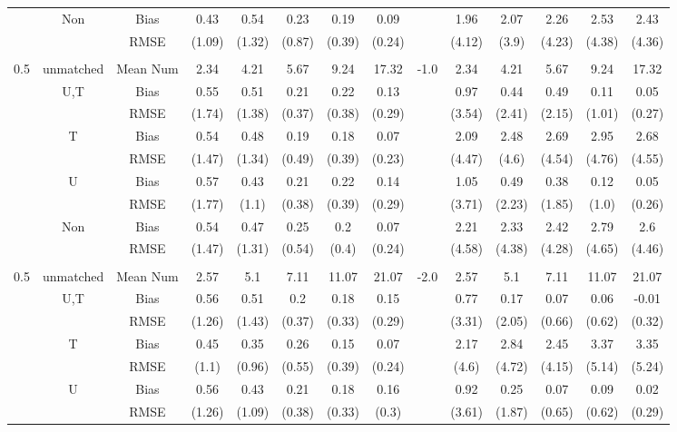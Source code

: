 \begin{tabular}{@{\extracolsep{5pt}}lc|cccccc|lccccc}
 & Non & Bias & 0.43 & 0.54 & 0.23 & 0.19 & 0.09 &  & 1.96 & 2.07 & 2.26 & 2.53 & 2.43 \\
 &  & RMSE & (1.09) & (1.32) & (0.87) & (0.39) & (0.24) &  & (4.12) & (3.9) & (4.23) & (4.38) & (4.36) \\
 &  &  &  &  &  &  &  &  &  &  &  &  &  \\
0.5 & unmatched & Mean Num & 2.34 & 4.21 & 5.67 & 9.24 & 17.32 & -1.0 & 2.34 & 4.21 & 5.67 & 9.24 & 17.32 \\
 & U,T & Bias & 0.55 & 0.51 & 0.21 & 0.22 & 0.13 &  & 0.97 & 0.44 & 0.49 & 0.11 & 0.05 \\
 &  & RMSE & (1.74) & (1.38) & (0.37) & (0.38) & (0.29) &  & (3.54) & (2.41) & (2.15) & (1.01) & (0.27) \\
 & T & Bias & 0.54 & 0.48 & 0.19 & 0.18 & 0.07 &  & 2.09 & 2.48 & 2.69 & 2.95 & 2.68 \\
 &  & RMSE & (1.47) & (1.34) & (0.49) & (0.39) & (0.23) &  & (4.47) & (4.6) & (4.54) & (4.76) & (4.55) \\
 & U & Bias & 0.57 & 0.43 & 0.21 & 0.22 & 0.14 &  & 1.05 & 0.49 & 0.38 & 0.12 & 0.05 \\
 &  & RMSE & (1.77) & (1.1) & (0.38) & (0.39) & (0.29) &  & (3.71) & (2.23) & (1.85) & (1.0) & (0.26) \\
 & Non & Bias & 0.54 & 0.47 & 0.25 & 0.2 & 0.07 &  & 2.21 & 2.33 & 2.42 & 2.79 & 2.6 \\
 &  & RMSE & (1.47) & (1.31) & (0.54) & (0.4) & (0.24) &  & (4.58) & (4.38) & (4.28) & (4.65) & (4.46) \\
 &  &  &  &  &  &  &  &  &  &  &  &  &  \\
0.5 & unmatched & Mean Num & 2.57 & 5.1 & 7.11 & 11.07 & 21.07 & -2.0 & 2.57 & 5.1 & 7.11 & 11.07 & 21.07 \\
 & U,T & Bias & 0.56 & 0.51 & 0.2 & 0.18 & 0.15 &  & 0.77 & 0.17 & 0.07 & 0.06 & -0.01 \\
 &  & RMSE & (1.26) & (1.43) & (0.37) & (0.33) & (0.29) &  & (3.31) & (2.05) & (0.66) & (0.62) & (0.32) \\
 & T & Bias & 0.45 & 0.35 & 0.26 & 0.15 & 0.07 &  & 2.17 & 2.84 & 2.45 & 3.37 & 3.35 \\
 &  & RMSE & (1.1) & (0.96) & (0.55) & (0.39) & (0.24) &  & (4.6) & (4.72) & (4.15) & (5.14) & (5.24) \\
 & U & Bias & 0.56 & 0.43 & 0.21 & 0.18 & 0.16 &  & 0.92 & 0.25 & 0.07 & 0.09 & 0.02 \\
 &  & RMSE & (1.26) & (1.09) & (0.38) & (0.33) & (0.3) &  & (3.61) & (1.87) & (0.65) & (0.62) & (0.29) \\

\end{tabular}
